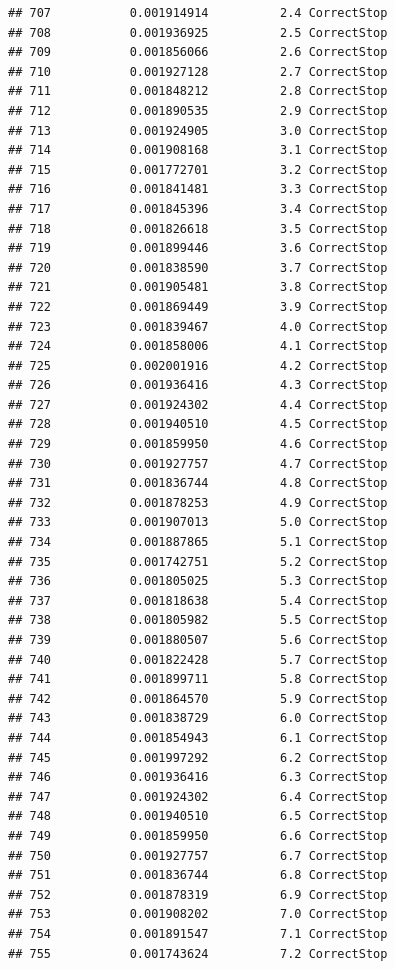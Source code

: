 \documentclass[
]{article}
\begin{document}
\begin{verbatim}
## 707           0.001914914          2.4 CorrectStop
## 708           0.001936925          2.5 CorrectStop
## 709           0.001856066          2.6 CorrectStop
## 710           0.001927128          2.7 CorrectStop
## 711           0.001848212          2.8 CorrectStop
## 712           0.001890535          2.9 CorrectStop
## 713           0.001924905          3.0 CorrectStop
## 714           0.001908168          3.1 CorrectStop
## 715           0.001772701          3.2 CorrectStop
## 716           0.001841481          3.3 CorrectStop
## 717           0.001845396          3.4 CorrectStop
## 718           0.001826618          3.5 CorrectStop
## 719           0.001899446          3.6 CorrectStop
## 720           0.001838590          3.7 CorrectStop
## 721           0.001905481          3.8 CorrectStop
## 722           0.001869449          3.9 CorrectStop
## 723           0.001839467          4.0 CorrectStop
## 724           0.001858006          4.1 CorrectStop
## 725           0.002001916          4.2 CorrectStop
## 726           0.001936416          4.3 CorrectStop
## 727           0.001924302          4.4 CorrectStop
## 728           0.001940510          4.5 CorrectStop
## 729           0.001859950          4.6 CorrectStop
## 730           0.001927757          4.7 CorrectStop
## 731           0.001836744          4.8 CorrectStop
## 732           0.001878253          4.9 CorrectStop
## 733           0.001907013          5.0 CorrectStop
## 734           0.001887865          5.1 CorrectStop
## 735           0.001742751          5.2 CorrectStop
## 736           0.001805025          5.3 CorrectStop
## 737           0.001818638          5.4 CorrectStop
## 738           0.001805982          5.5 CorrectStop
## 739           0.001880507          5.6 CorrectStop
## 740           0.001822428          5.7 CorrectStop
## 741           0.001899711          5.8 CorrectStop
## 742           0.001864570          5.9 CorrectStop
## 743           0.001838729          6.0 CorrectStop
## 744           0.001854943          6.1 CorrectStop
## 745           0.001997292          6.2 CorrectStop
## 746           0.001936416          6.3 CorrectStop
## 747           0.001924302          6.4 CorrectStop
## 748           0.001940510          6.5 CorrectStop
## 749           0.001859950          6.6 CorrectStop
## 750           0.001927757          6.7 CorrectStop
## 751           0.001836744          6.8 CorrectStop
## 752           0.001878319          6.9 CorrectStop
## 753           0.001908202          7.0 CorrectStop
## 754           0.001891547          7.1 CorrectStop
## 755           0.001743624          7.2 CorrectStop

\end{verbatim}
\end{document}
